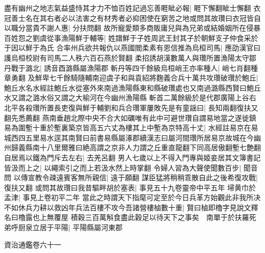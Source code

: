 盡有幽州之地志氣益盛恃其才力不恤百姓記過忘善睚眦必報|{
	睚下懈翻眦士懈翻}
衣冠善士名在其右者必以法害之有材秀者必抑困使在窮苦之地或問其故瓚曰衣冠皆自以職分當貴不謝人惠|{
	分扶問翻}
故所寵愛類多商販庸兒與為兄弟或結婚姻所在侵暴百姓怨之劉虞從事漁陽鮮于輔等|{
	姓譜鮮于子姓周武王封其子於朝鮮支子仲食采於于因以鮮于為氏}
合率州兵欲共報仇以燕國閻柔素有恩信推為烏桓司馬|{
	應劭漢官曰護烏桓校尉有司馬二人秩六百石燕於賢翻}
柔招誘胡漢數萬人與瓚所置漁陽太守鄒丹戰于潞北|{
	誘音酉潞縣屬漁陽郡}
斬丹等四千餘級烏桓峭王亦率種人|{
	峭七肖翻種章勇翻}
及鮮卑七千餘騎隨輔南迎虞子和與袁紹將麴義合兵十萬共攻瓚破瓚於鮑丘|{
	鮑丘水名水經註鮑丘水從塞外來南過漁陽縣東和縣破瓚處也又南過潞縣西賢曰鮑丘水又謂之潞水俗又謂之大榆河在今幽州漁陽縣}
斬首二萬餘級於是代郡廣陽上谷右北平各殺瓚所置長吏復與鮮于輔劉和兵合瓚軍屢敗先是有童謡曰|{
	長知兩翻復扶又翻先悉薦翻}
燕南垂趙北際中央不合大如礪唯有此中可避世瓚自謂易地當之遂徙鎮易為圍塹十重於塹裏築京皆高五六丈為樓其上中塹為京特高十丈|{
	水經註易京在易城西四五里易水逕其南賢曰前書易縣屬涿郡續漢志曰屬河間瓚所居易京故城在今幽州歸義縣南十八里爾雅曰絶高謂之京非人力謂之丘重直龍翻下同高居傲翻塹七艶翻}
自居焉以鐵為門斥去左右|{
	去羌呂翻}
男人七歲以上不得入門專與姬妾居其文簿書記皆汲而上之|{
	以繩索引之而上若汲水然上時掌翻}
令婦人習為大聲使聞數百步|{
	聞音問}
以傳宣教令疎遠賓客無所親信|{
	遠于願翻}
謀臣猛將稍稍乖散自此之後希復攻戰|{
	復扶又翻}
或問其故瓚曰我昔驅畔胡於塞表|{
	事見五十九卷靈帝中平五年}
埽黄巾於孟津|{
	事見上卷初平二年}
當此之時謂天下指麾可定至於今日兵革方始觀此非我所决不如休兵力耕以救凶年兵法百樓不攻今吾諸營樓樐數十重|{
	賢曰樐即櫓字見說文釋名曰櫓露也上無覆屋}
積穀三百萬斛食盡此穀足以待天下之事矣　南單于於扶羅死弟呼厨泉立居于平陽|{
	平陽縣屬河東郡}


資治通鑑卷六十一
